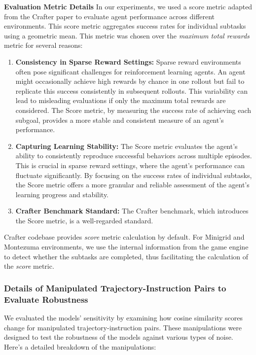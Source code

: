 \documentclass{article}
\theoremstyle{plain}
\theoremstyle{definition}
\theoremstyle{remark}
\begin{document}
\noindent\textbf{Evaluation Metric Details}\quad
In our experiments, we used a score metric adapted from the Crafter paper to evaluate agent performance across different environments. This score metric aggregates success rates for individual subtasks using a geometric mean. This metric was chosen over the \emph{maximum total rewards} metric for several reasons:
\begin{enumerate}
    \item \textbf{Consistency in Sparse Reward Settings:} Sparse reward environments often pose significant challenges for reinforcement learning agents. An agent might occasionally achieve high rewards by chance in one rollout but fail to replicate this success consistently in subsequent rollouts. This variability can lead to misleading evaluations if only the maximum total rewards are considered. The Score metric, by measuring the success rate of achieving each subgoal, provides a more stable and consistent measure of an agent's performance.
    \item \textbf{Capturing Learning Stability:} The Score metric evaluates the agent's ability to consistently reproduce successful behaviors across multiple episodes. This is crucial in sparse reward settings, where the agent's performance can fluctuate significantly. By focusing on the success rates of individual subtasks, the Score metric offers a more granular and reliable assessment of the agent's learning progress and stability.
    \item \textbf{Crafter Benchmark Standard:} The Crafter benchmark, which introduces the Score metric, is a well-regarded standard.
\end{enumerate}

Crafter codebase provides \emph{score} metric calculation by default. For Minigrid and Montezuma environments, we use the internal information from the game engine to detect whether the subtasks are completed, thus facilitating the calculation of the \emph{score} metric. 

\subsubsection{Details of Manipulated Trajectory-Instruction Pairs to Evaluate Robustness }
We evaluated the models' sensitivity by examining how cosine similarity scores change for manipulated trajectory-instruction pairs. These manipulations were designed to test the robustness of the models against various types of noise. Here's a detailed breakdown of the manipulations:
\end{document}
